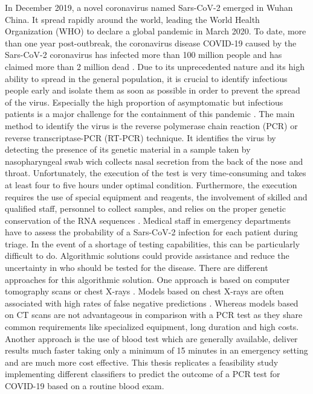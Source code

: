 In December 2019, a novel coronavirus named Sars-CoV-2 emerged in Wuhan China. 
It spread rapidly around the world, leading the World Health Organization (WHO) 
to declare a global pandemic in March 2020. To date, more than one year 
post-outbreak, the coronavirus disease COVID-19 caused by the Sars-CoV-2 
coronavirus has infected more than 100 million people and has claimed more than 
2 million dead \cite{RN204}. Due to its unprecedented nature and its high 
ability to spread in the general population, it is crucial to identify 
infectious people early and isolate them as soon as possible in order to 
prevent the spread of the virus. Especially the high proportion of asymptomatic 
but infectious patients is a major challenge for the containment of this 
pandemic \cite{RN205}. The main method to identify the virus is the reverse 
polymerase chain reaction (PCR) or reverse transcriptase-PCR (RT-PCR) 
technique. It identifies the virus by detecting the presence of its genetic 
material in a sample taken by nasopharyngeal swab wich collects nasal 
secretion from the back of the nose and throat. Unfortunately, the execution of 
the test is very time-consuming and takes at least four to five hours under 
optimal condition. 
Furthermore, the execution requires the use of special equipment and reagents, 
the involvement of skilled and qualified staff, personnel to collect samples, 
and relies on the proper genetic conservation of the RNA sequences 
\cite{RN201, RN202}.
Medical staff in emergency departments have to assess the probability of a 
Sars-CoV-2 infection for each patient during triage. In the event of a shortage 
of testing capabilities, this can be particularly difficult to do. Algorithmic 
solutions could provide assistance and reduce the uncertainty in who should be 
tested for the disease. There are different approaches for this algorithmic 
solution.
One approach is based on computer tomography scans or chest X-rays 
\cite{RN200}. Models based on chest X-rays are often associated with high rates 
of false negative predictions \cite{RN200, RN206}. Whereas models based on CT 
scans are not advantageous in comparison with a PCR test as they share common 
requirements like specialized equipment, long duration and high costs.
Another approach is the use of blood test which are generally available, 
deliver results much faster taking only a minimum of 15 minutes in an emergency 
setting and are much more cost effective.
This thesis replicates a feasibility study implementing different classifiers 
to predict the outcome of a PCR test for COVID-19 based on a routine blood exam.
